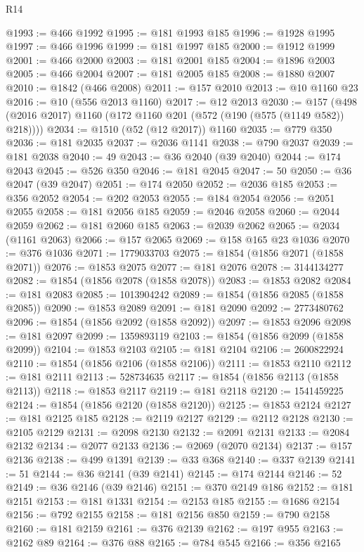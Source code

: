 \begin{lexlean}{R14}
\begin{coremodule}
@1993 := @466 @1992
@1995 := @181 @1993 @185
@1996 := @1928 @1995
@1997 := @466 @1996
@1999 := @181 @1997 @185
@2000 := @1912 @1999
@2001 := @466 @2000
@2003 := @181 @2001 @185
@2004 := @1896 @2003
@2005 := @466 @2004
@2007 := @181 @2005 @185
@2008 := @1880 @2007
@2010 := @1842 (@466 @2008)
@2011 := @157 @2010
@2013 := @10 @1160 @23
@2016 := @10 (@556 @2013 @1160)
@2017 := @12 @2013
@2030 := @157 (@498 (@2016 @2017) @1160 (@172 @1160 @201 (@572 (@190 (@575 (@1149 @582)) @218))))
@2034 := @1510 (@52 (@12 @2017)) @1160
@2035 := @779 @350
@2036 := @181 @2035
@2037 := @2036 @1141
@2038 := @790 @2037
@2039 := @181 @2038
@2040 := 49
@2043 := @36 @2040 (@39 @2040)
@2044 := @174 @2043
@2045 := @526 @350
@2046 := @181 @2045
@2047 := 50
@2050 := @36 @2047 (@39 @2047)
@2051 := @174 @2050
@2052 := @2036 @185
@2053 := @356 @2052
@2054 := @202 @2053
@2055 := @184 @2054
@2056 := @2051 @2055
@2058 := @181 @2056 @185
@2059 := @2046 @2058
@2060 := @2044 @2059
@2062 := @181 @2060 @185
@2063 := @2039 @2062
@2065 := @2034 (@1161 @2063)
@2066 := @157 @2065
@2069 := @158 @165 @23 @1036
@2070 := @376 @1036
@2071 := 1779033703
@2075 := @1854 (@1856 @2071 (@1858 @2071))
@2076 := @1853 @2075
@2077 := @181 @2076
@2078 := 3144134277
@2082 := @1854 (@1856 @2078 (@1858 @2078))
@2083 := @1853 @2082
@2084 := @181 @2083
@2085 := 1013904242
@2089 := @1854 (@1856 @2085 (@1858 @2085))
@2090 := @1853 @2089
@2091 := @181 @2090
@2092 := 2773480762
@2096 := @1854 (@1856 @2092 (@1858 @2092))
@2097 := @1853 @2096
@2098 := @181 @2097
@2099 := 1359893119
@2103 := @1854 (@1856 @2099 (@1858 @2099))
@2104 := @1853 @2103
@2105 := @181 @2104
@2106 := 2600822924
@2110 := @1854 (@1856 @2106 (@1858 @2106))
@2111 := @1853 @2110
@2112 := @181 @2111
@2113 := 528734635
@2117 := @1854 (@1856 @2113 (@1858 @2113))
@2118 := @1853 @2117
@2119 := @181 @2118
@2120 := 1541459225
@2124 := @1854 (@1856 @2120 (@1858 @2120))
@2125 := @1853 @2124
@2127 := @181 @2125 @185
@2128 := @2119 @2127
@2129 := @2112 @2128
@2130 := @2105 @2129
@2131 := @2098 @2130
@2132 := @2091 @2131
@2133 := @2084 @2132
@2134 := @2077 @2133
@2136 := @2069 (@2070 @2134)
@2137 := @157 @2136
@2138 := @499 @1391
@2139 := @33 @368
@2140 := @337 @2139
@2141 := 51
@2144 := @36 @2141 (@39 @2141)
@2145 := @174 @2144
@2146 := 52
@2149 := @36 @2146 (@39 @2146)
@2151 := @370 @2149 @186
@2152 := @181 @2151
@2153 := @181 @1331
@2154 := @2153 @185
@2155 := @1686 @2154
@2156 := @792 @2155
@2158 := @181 @2156 @850
@2159 := @790 @2158
@2160 := @181 @2159
@2161 := @376 @2139
@2162 := @197 @955
@2163 := @2162 @89
@2164 := @376 @88
@2165 := @784 @545
@2166 := @356 @2165

\end{coremodule}
\end{lexlean}
